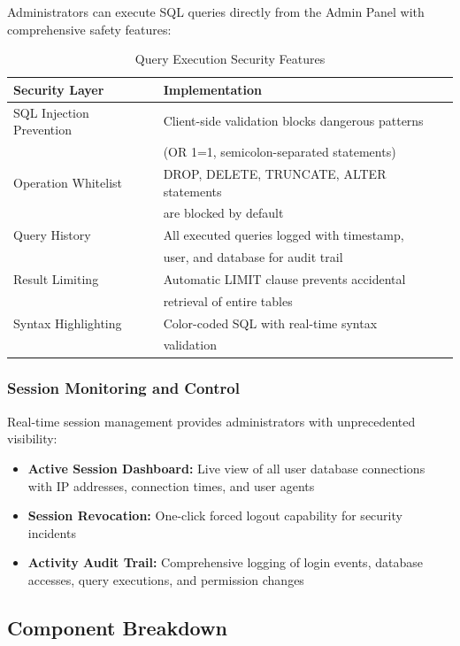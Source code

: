 Administrators can execute SQL queries directly from the Admin Panel with comprehensive safety features:

\begin{table}[H]
\centering
\caption{Query Execution Security Features}
\small
\begin{tabular}{|l|l|}
\hline

\textbf{Security Layer} & \textbf{Implementation} \\
\hline
SQL Injection Prevention & Client-side validation blocks dangerous patterns \\
 & (OR 1=1, semicolon-separated statements) \\
\hline
Operation Whitelist & DROP, DELETE, TRUNCATE, ALTER statements \\
 & are blocked by default \\
\hline
Query History & All executed queries logged with timestamp, \\
 & user, and database for audit trail \\
\hline
Result Limiting & Automatic LIMIT clause prevents accidental \\
 & retrieval of entire tables \\
\hline
Syntax Highlighting & Color-coded SQL with real-time syntax \\
 & validation \\
\hline
\end{tabular}
\end{table}

\subsubsection{Session Monitoring and Control}

Real-time session management provides administrators with unprecedented visibility:

\begin{itemize}
    \item \textbf{Active Session Dashboard:} Live view of all user database connections with IP addresses, connection times, and user agents
    \item \textbf{Session Revocation:} One-click forced logout capability for security incidents
    \item \textbf{Activity Audit Trail:} Comprehensive logging of login events, database accesses, query executions, and permission changes
\end{itemize}

\subsection{Component Breakdown}

